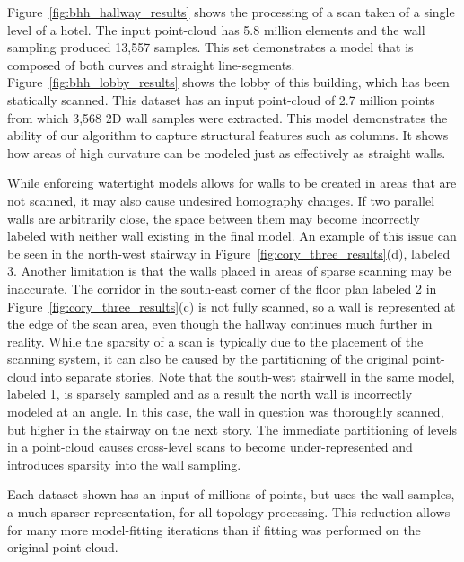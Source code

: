\documentclass[10pt,twocolumn,letterpaper]{article}
\begin{document}
Figure~\ref{fig:bhh_hallway_results} shows the processing of a scan taken of a single level of a hotel.  The input point-cloud has 5.8 million elements and the wall sampling produced 13,557 samples.  This set demonstrates a model that is composed of both curves and straight line-segments. Figure~\ref{fig:bhh_lobby_results} shows the lobby of this building, which has been statically scanned.  This dataset has an input point-cloud of 2.7 million points from which 3,568 2D wall samples were extracted. This model demonstrates the ability of our algorithm to capture structural features such as columns.  It shows how areas of high curvature can be modeled just as effectively as straight walls.

While enforcing watertight models allows for walls to be created in areas that are not scanned, it may also cause undesired homography changes.  If two parallel walls are arbitrarily close, the space between them may become incorrectly labeled with neither wall existing in the final model.  An example of this issue can be seen in the north-west stairway in Figure~\ref{fig:cory_three_results}(d), labeled 3.  Another limitation is that the walls placed in areas of sparse scanning may be inaccurate.  The corridor in the south-east corner of the floor plan labeled 2 in Figure~\ref{fig:cory_three_results}(c) is not fully scanned, so a wall is represented at the edge of the scan area, even though the hallway continues much further in reality.  While the sparsity of a scan is typically due to the placement of the scanning system, it can also be caused by the partitioning of the original point-cloud into separate stories.  Note that the south-west stairwell in the same model, labeled 1, is sparsely sampled and as a result the north wall is incorrectly modeled at an angle.  In this case, the wall in question was thoroughly scanned, but higher in the stairway on the next story.  The immediate partitioning of levels in a point-cloud causes cross-level scans to become under-represented and introduces sparsity into the wall sampling.

Each dataset shown has an input of millions of points, but uses the wall samples, a much sparser representation, for all topology processing.  This reduction allows for many more model-fitting iterations than if fitting was performed on the original point-cloud.

\end{document}
